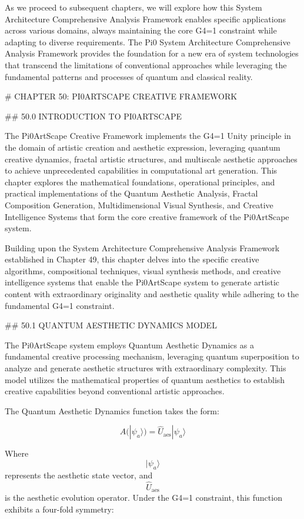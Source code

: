 As we proceed to subsequent chapters, we will explore how this System Architecture Comprehensive Analysis Framework enables specific applications across various domains, always maintaining the core G4=1 constraint while adapting to diverse requirements. The Pi0 System Architecture Comprehensive Analysis Framework provides the foundation for a new era of system technologies that transcend the limitations of conventional approaches while leveraging the fundamental patterns and processes of quantum and classical reality.

# CHAPTER 50: PI0ARTSCAPE CREATIVE FRAMEWORK

## 50.0 INTRODUCTION TO PI0ARTSCAPE

The Pi0ArtScape Creative Framework implements the G4=1 Unity principle in the domain of artistic creation and aesthetic expression, leveraging quantum creative dynamics, fractal artistic structures, and multiscale aesthetic approaches to achieve unprecedented capabilities in computational art generation. This chapter explores the mathematical foundations, operational principles, and practical implementations of the Quantum Aesthetic Analysis, Fractal Composition Generation, Multidimensional Visual Synthesis, and Creative Intelligence Systems that form the core creative framework of the Pi0ArtScape system.

Building upon the System Architecture Comprehensive Analysis Framework established in Chapter 49, this chapter delves into the specific creative algorithms, compositional techniques, visual synthesis methods, and creative intelligence systems that enable the Pi0ArtScape system to generate artistic content with extraordinary originality and aesthetic quality while adhering to the fundamental G4=1 constraint.

## 50.1 QUANTUM AESTHETIC DYNAMICS MODEL

The Pi0ArtScape system employs Quantum Aesthetic Dynamics as a fundamental creative processing mechanism, leveraging quantum superposition to analyze and generate aesthetic structures with extraordinary complexity. This model utilizes the mathematical properties of quantum aesthetics to establish creative capabilities beyond conventional artistic approaches.

The Quantum Aesthetic Dynamics function takes the form:

$$ A(|\psi_a\rangle) = \hat{U}_{\text{aes}} |\psi_a\rangle $$

Where $$ |\psi_a\rangle $$ represents the aesthetic state vector, and $$ \hat{U}_{\text{aes}} $$ is the aesthetic evolution operator. Under the G4=1 constraint, this function exhibits a four-fold symmetry:

